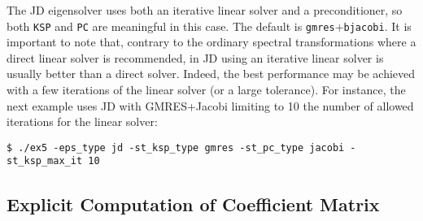 	The JD eigensolver uses both an iterative linear solver and a preconditioner, so both \texttt{KSP} and \texttt{PC} are meaningful in this case. The default is \texttt{gmres}+\texttt{bjacobi}. It is important to note that, contrary to the ordinary spectral transformations where a direct linear solver is recommended, in JD using an iterative linear solver is usually better than a direct solver. Indeed, the best performance may be achieved with a few iterations of the linear solver (or a large tolerance). For instance, the next example uses JD with GMRES+Jacobi limiting to 10 the number of allowed iterations for the linear solver:
\begin{Verbatim}[fontsize=\small]
	$ ./ex5 -eps_type jd -st_ksp_type gmres -st_pc_type jacobi -st_ksp_max_it 10
\end{Verbatim}

\subsection{Explicit Computation of Coefficient Matrix}
\label{sec:explicit}

